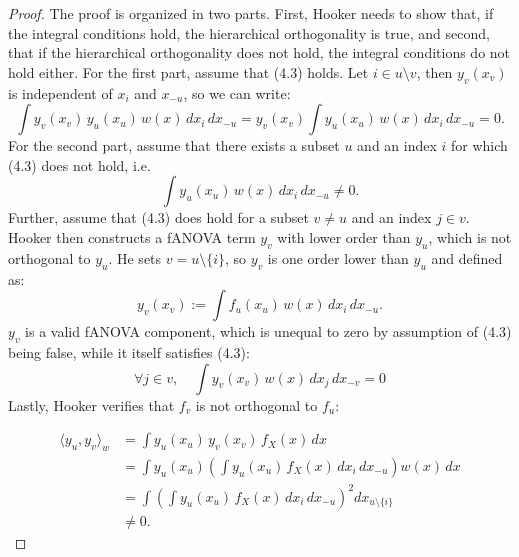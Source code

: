 \begin{proof}
    The proof is organized in two parts. First, Hooker needs to show that, if the integral conditions hold, the hierarchical orthogonality is true, and second, that if the hierarchical orthogonality does not hold, the integral conditions do not hold either.
    For the first part, assume that (4.3) holds. Let $i \in u \setminus v$, then $y_v(x_v)$ is independent of $x_i$ and $x_{-u}$, so we can write:
    \begin{equation}
        \int y_v(x_v)\, y_u(x_u)\, w(x)\, dx_i\, dx_{-u}
        = y_v(x_v) \int y_u(x_u)\, w(x)\, dx_i\, dx_{-u} = 0.
    \end{equation}
    For the second part, assume that there exists a subset $u$ and an index $i$ for which (4.3) does not hold, i.e.
    \begin{equation}
        \int y_u(x_u)\, w(x)\, dx_i\, dx_{-u} \ne 0.
    \end{equation}
    Further, assume that (4.3) does hold for a subset $v \neq u$ and an index $j \in v$. Hooker then constructs a fANOVA term $y_v$ with lower order than $y_u$, which is not orthogonal to $y_u$. He sets $v = u \setminus \{i\}$, so $y_v$ is one order lower than $y_u$ and defined as:
    \begin{equation}
        y_v(x_v) := \int f_u(x_u) \, w(x) \, dx_i \, dx_{-u}.
    \end{equation}
    $y_v$ is a valid fANOVA component, which is unequal to zero by assumption of (4.3) being false, while it itself satisfies (4.3):
    \begin{equation}
        \forall j \in v, \quad \int y_v(x_v) \, w(x) \, dx_j \, dx_{-v} = 0
    \end{equation}
    Lastly, Hooker verifies that $f_v$ is not orthogonal to $f_u$:

    \begin{equation}
        \begin{aligned}
            \langle y_u, y_v \rangle_w 
            &= \int y_u(x_u) \, y_v(x_v) \, f_X(x) \, dx \\
            &= \int y_u(x_u) \left( \int y_u(x_u) \, f_X(x) \, dx_i \, dx_{-u} \right) w(x) \, dx \\
            &= \int \left( \int y_u(x_u) \, f_X(x) \, dx_i \, dx_{-u} \right)^2 dx_{u \setminus \{i\}} \\
            &\neq 0.
        \end{aligned}
    \end{equation}

\end{proof}



